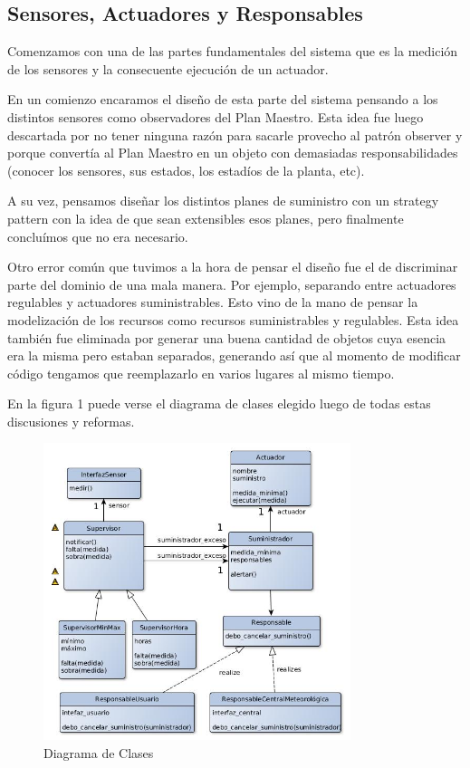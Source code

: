 \subsection{Sensores, Actuadores y Responsables}
Comenzamos con una de las partes fundamentales del sistema que es la medición de los sensores y la consecuente ejecución de un actuador. \newline

 
En un comienzo encaramos el diseño de esta parte del sistema pensando a los distintos sensores como observadores del Plan Maestro. Esta idea fue luego descartada por no tener ninguna razón para sacarle provecho al patrón observer y porque convertía al Plan Maestro en un objeto con demasiadas responsabilidades (conocer los sensores, sus estados, los estadíos de la planta, etc).

A su vez, pensamos diseñar los distintos planes de suministro con un strategy pattern con la idea de que sean extensibles esos planes, pero finalmente concluímos que no era necesario.\newline


 
Otro error común que tuvimos a la hora de pensar el diseño fue el de discriminar parte del dominio de una mala manera. Por ejemplo, separando entre actuadores regulables y actuadores suministrables. Esto vino de la mano de pensar la modelización de los recursos como recursos suministrables y regulables. Esta idea también fue eliminada por generar una buena cantidad de objetos cuya esencia era la misma pero estaban separados, generando así que al momento de modificar código tengamos que reemplazarlo en varios lugares al mismo tiempo.\newline

 
En la figura 1 puede verse el diagrama de clases elegido luego de todas estas discusiones y reformas.

\begin{figure}[h!]
  \centering
  \includegraphics[width=0.8\textwidth]{./imagenes/clases2.jpg}
  \caption{Diagrama de Clases}
  \label{fig:sec_sum1}
\end{figure}


